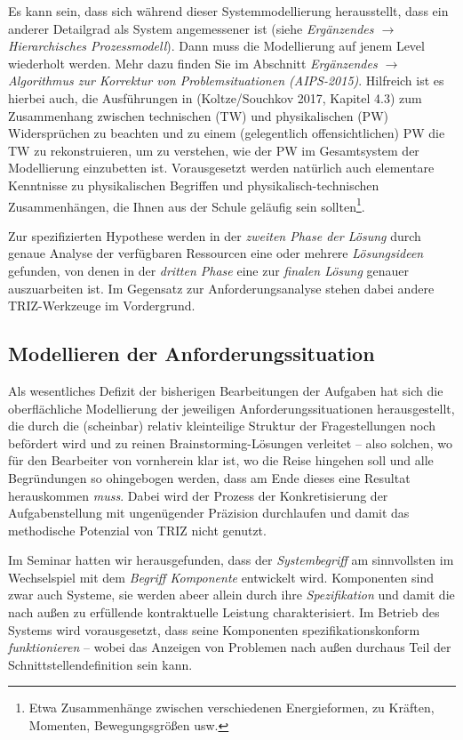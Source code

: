 \documentclass[11pt,a4paper]{article}
\begin{document}
Es kann sein, dass sich während dieser Systemmodellierung herausstellt, dass
ein anderer Detailgrad als System angemessener ist (siehe \emph{Ergänzendes
  $\to$ Hierarchisches Prozessmodell}).  Dann muss die Modellierung auf jenem
Level wiederholt werden. Mehr dazu finden Sie im Abschnitt \emph{Ergänzendes
  $\to$ Algorithmus zur Korrektur von Problemsituationen (AIPS-2015)}.
Hilfreich ist es hierbei auch, die Ausführungen in (Koltze/Souchkov 2017,
Kapitel 4.3) zum Zusammenhang zwischen technischen (TW) und physikalischen
(PW) Widersprüchen zu beachten und zu einem (gelegentlich offensichtlichen) PW
die TW zu rekonstruieren, um zu verstehen, wie der PW im Gesamtsystem der
Modellierung einzubetten ist.  Vorausgesetzt werden natürlich auch elementare
Kenntnisse zu physikalischen Begriffen und physikalisch-technischen
Zusammenhängen, die Ihnen aus der Schule geläufig sein sollten\footnote{Etwa
  Zusammenhänge zwischen verschiedenen Energieformen, zu Kräften, Momenten,
  Bewegungsgrößen usw.}.

Zur spezifizierten Hypothese werden in der \emph{zweiten Phase der Lösung}
durch genaue Analyse der verfügbaren Ressourcen eine oder mehrere
\emph{Lösungsideen} gefunden, von denen in der \emph{dritten Phase} eine zur
\emph{finalen Lösung} genauer auszuarbeiten ist.  Im Gegensatz zur
Anforderungsanalyse stehen dabei andere TRIZ-Werkzeuge im Vordergrund.

\subsection{Modellieren der Anforderungssituation}

Als wesentliches Defizit der bisherigen Bearbeitungen der Aufgaben hat sich
die oberflächliche Modellierung der jeweiligen Anforderungssituationen
herausgestellt, die durch die (scheinbar) relativ kleinteilige Struktur der
Fragestellungen noch befördert wird und zu reinen Brainstorming-Lösungen
verleitet -- also solchen, wo für den Bearbeiter von vornherein klar ist, wo
die Reise hingehen soll und alle Begründungen so ohingebogen werden, dass am
Ende dieses eine Resultat herauskommen \emph{muss}.  Dabei wird der Prozess
der Konkretisierung der Aufgabenstellung mit ungenügender Präzision
durchlaufen und damit das methodische Potenzial von TRIZ nicht genutzt.

Im Seminar hatten wir herausgefunden, dass der \emph{Systembegriff} am
sinnvollsten im Wechselspiel mit dem \emph{Begriff Komponente} entwickelt
wird.  Komponenten  sind zwar auch Systeme, sie werden abeer allein durch ihre
\emph{Spezifikation} und damit die nach außen zu erfüllende kontraktuelle
Leistung charakterisiert.  Im Betrieb des Systems wird vorausgesetzt, dass
seine Komponenten spezifikationskonform \emph{funktionieren} -- wobei das
Anzeigen von Problemen nach außen durchaus Teil der Schnittstellendefinition
sein kann.
\end{document}
